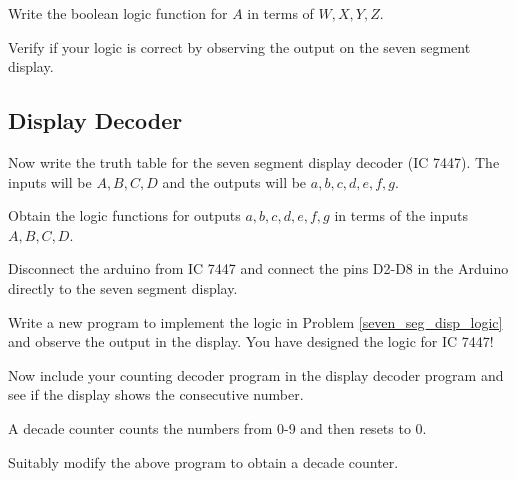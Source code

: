 \begin{problem}
	\label{counter_dec}

Write the boolean logic function for $A$ in terms of $W,X,Y,Z$.
\end{problem}
%

%
\begin{problem}
Verify if your logic is correct by observing the output on the seven segment display.
\end{problem}
%
\subsection{Display Decoder}
%
\begin{problem}
Now write the truth table for the seven segment display decoder (IC 7447).  The inputs will be $A,B,C,D$ and the outputs will be $a,b,c,d,e,f,g$.
\end{problem}
%
\begin{problem}
\label{seven_seg_disp_logic}
Obtain the logic functions for outputs $a,b,c,d,e,f,g$ in terms of the inputs $A,B,C,D$.
\end{problem}
\begin{problem}
Disconnect the arduino from IC 7447 and connect the pins D2-D8 in the Arduino directly to the seven segment display.
\end{problem}
\begin{problem}
Write a new program to implement the logic in Problem \ref{seven_seg_disp_logic} and observe the output in the display.  You have designed the logic for IC 7447!
\end{problem}
\begin{problem}
Now include your counting decoder program in the  display decoder program
and see if the display shows the consecutive number.
\end{problem}
A decade counter counts the numbers from 0-9 and then resets to 0.
\begin{problem}
Suitably modify the above program to obtain a decade counter.
\end{problem}




